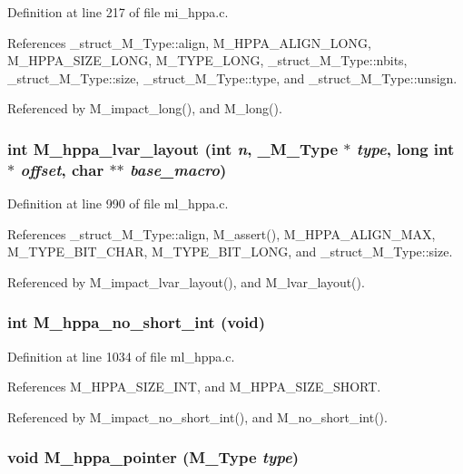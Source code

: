 Definition at line 217 of file mi\_\-hppa.c.

References \_\-struct\_\-M\_\-Type::align, M\_\-HPPA\_\-ALIGN\_\-LONG, M\_\-HPPA\_\-SIZE\_\-LONG, M\_\-TYPE\_\-LONG, \_\-struct\_\-M\_\-Type::nbits, \_\-struct\_\-M\_\-Type::size, \_\-struct\_\-M\_\-Type::type, and \_\-struct\_\-M\_\-Type::unsign.

Referenced by M\_\-impact\_\-long(), and M\_\-long().
\subsubsection{\setlength{\rightskip}{0pt plus 5cm}int M\_\-hppa\_\-lvar\_\-layout (int {\em n}, \bf{\_\-M\_\-Type} $\ast$ {\em type}, long int $\ast$ {\em offset}, char $\ast$$\ast$ {\em base\_\-macro})}\label{m__hppa_8h_0a0da56cc84f57410199e37f0a5f7628}




Definition at line 990 of file ml\_\-hppa.c.

References \_\-struct\_\-M\_\-Type::align, M\_\-assert(), M\_\-HPPA\_\-ALIGN\_\-MAX, M\_\-TYPE\_\-BIT\_\-CHAR, M\_\-TYPE\_\-BIT\_\-LONG, and \_\-struct\_\-M\_\-Type::size.

Referenced by M\_\-impact\_\-lvar\_\-layout(), and M\_\-lvar\_\-layout().
\subsubsection{\setlength{\rightskip}{0pt plus 5cm}int M\_\-hppa\_\-no\_\-short\_\-int (void)}\label{m__hppa_8h_dbed763f132cceeb65e656b6d8e496e7}




Definition at line 1034 of file ml\_\-hppa.c.

References M\_\-HPPA\_\-SIZE\_\-INT, and M\_\-HPPA\_\-SIZE\_\-SHORT.

Referenced by M\_\-impact\_\-no\_\-short\_\-int(), and M\_\-no\_\-short\_\-int().
\subsubsection{\setlength{\rightskip}{0pt plus 5cm}void M\_\-hppa\_\-pointer (\bf{M\_\-Type} {\em type})}\label{m__hppa_8h_528caf4e3e210b61f1eae6ef859a6f77}




